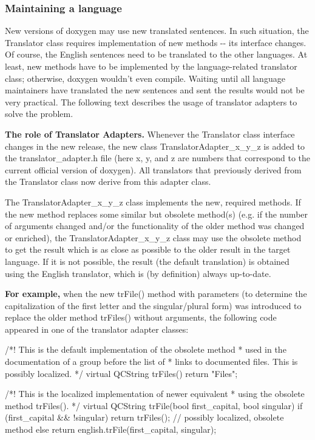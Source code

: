 \subsubsection*{Maintaining a language}

New versions of doxygen may use new translated sentences. In such situation, the {\ttfamily Translator} class requires implementation of new methods -\/-\/ its interface changes. Of course, the English sentences need to be translated to the other languages. At least, new methods have to be implemented by the language-\/related translator class; otherwise, doxygen wouldn't even compile. Waiting until all language maintainers have translated the new sentences and sent the results would not be very practical. The following text describes the usage of translator adapters to solve the problem.

{\bfseries The role of Translator Adapters.} Whenever the {\ttfamily Translator} class interface changes in the new release, the new class {\ttfamily TranslatorAdapter\_\-x\_\-y\_\-z} is added to the {\ttfamily translator\_\-adapter.h} file (here x, y, and z are numbers that correspond to the current official version of doxygen). All translators that previously derived from the {\ttfamily Translator} class now derive from this adapter class.

The {\ttfamily TranslatorAdapter\_\-x\_\-y\_\-z} class implements the new, required methods. If the new method replaces some similar but obsolete method(s) (e.g. if the number of arguments changed and/or the functionality of the older method was changed or enriched), the {\ttfamily TranslatorAdapter\_\-x\_\-y\_\-z} class may use the obsolete method to get the result which is as close as possible to the older result in the target language. If it is not possible, the result (the default translation) is obtained using the English translator, which is (by definition) always up-\/to-\/date.

{\bfseries For example,} when the new {\ttfamily trFile()} method with parameters (to determine the capitalization of the first letter and the singular/plural form) was introduced to replace the older method {\ttfamily trFiles()} without arguments, the following code appeared in one of the translator adapter classes:

\begin{DoxyVerb}
    /*! This is the default implementation of the obsolete method
     * used in the documentation of a group before the list of
     * links to documented files.  This is possibly localized.
     */
    virtual QCString trFiles()
    { return "Files"; }

    /*! This is the localized implementation of newer equivalent
     * using the obsolete method trFiles().
     */
    virtual QCString trFile(bool first_capital, bool singular)
    {
      if (first_capital && !singular)
        return trFiles();  // possibly localized, obsolete method
      else
        return english.trFile(first_capital, singular);
    }
\end{DoxyVerb}


